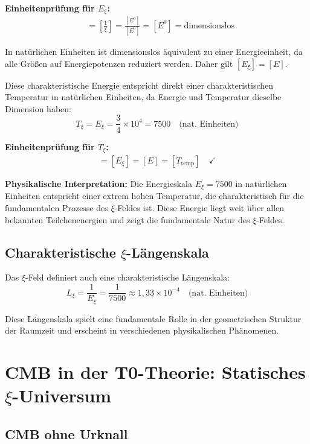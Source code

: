 	\textbf{Einheitenprüfung für $E_\xi$:}
	\begin{align}
		[E_\xi] &= \left[\frac{1}{\xi}\right] = \frac{[E^0]}{[E^0]} = [E^0] = \text{dimensionslos}
	\end{align}
	
	In natürlichen Einheiten ist dimensionslos äquivalent zu einer Energieeinheit, da alle Größ{}en auf Energiepotenzen reduziert werden. Daher gilt $[E_\xi] = [E]$.
	
	Diese charakteristische Energie entspricht direkt einer charakteristischen Temperatur in natürlichen Einheiten, da Energie und Temperatur dieselbe Dimension haben:
	\begin{equation}
		T_\xi = E_\xi = \frac{3}{4} \times 10^4 = 7500 \quad \text{(nat. Einheiten)}
	\end{equation}
	
	\textbf{Einheitenprüfung für $T_\xi$:}
	\begin{align}
		[T_\xi] = [E_\xi] = [E] = [T_{\text{temp}}] \quad \checkmark
	\end{align}
	
	\textbf{Physikalische Interpretation:} Die Energieskala $E_\xi = 7500$ in natürlichen Einheiten entspricht einer extrem hohen Temperatur, die charakteristisch für die fundamentalen Prozesse des $\xi$-Feldes ist. Diese Energie liegt weit über allen bekannten Teilchenenergien und zeigt die fundamentale Natur des $\xi$-Feldes.
	
	\subsection{Charakteristische $\xi$-Längenskala}
	
	Das $\xi$-Feld definiert auch eine charakteristische Längenskala:
	\begin{equation}
		L_\xi = \frac{1}{E_\xi} = \frac{1}{7500} \approx 1,33 \times 10^{-4} \quad \text{(nat. Einheiten)}
	\end{equation}
	
	Diese Längenskala spielt eine fundamentale Rolle in der geometrischen Struktur der Raumzeit und erscheint in verschiedenen physikalischen Phänomenen.
	
	\section{CMB in der T0-Theorie: Statisches $\xi$-Universum}
	
	\subsection{CMB ohne Urknall}
	
